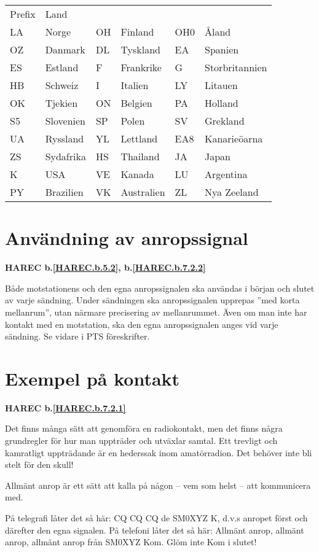 \begin{tabular}{llllll}
    Prefix & Land& & & &  \\
    LA & Norge & OH & Finland & OH0 & Åland\\
    OZ & Danmark & DL & Tyskland & EA & Spanien\\
    ES & Estland & F & Frankrike & G & Storbritannien\\
    HB & Schweiz & I & Italien & LY & Litauen\\
    OK & Tjekien & ON & Belgien & PA & Holland\\
    S5 & Slovenien & SP & Polen & SV & Grekland\\
    UA & Ryssland & YL & Lettland & EA8 & Kanarieöarna\\
    ZS & Sydafrika & HS & Thailand & JA & Japan\\
    K & USA & VE & Kanada & LU & Argentina\\
    PY & Brazilien & VK & Australien & ZL & Nya Zeeland\\
\end{tabular}


\section{Användning av anropssignal}
\textbf{HAREC
  b.\ref{HAREC.b.5.2}\label{myHAREC.b.5.2},
  b.\ref{HAREC.b.7.2.2}\label{myHAREC.b.7.2.2}
}

Både motstationens och den egna anropssignalen ska användas i början
och slutet av varje sändning.
Under sändningen ska anropssignalen upprepas ''med korta mellanrum'', utan
närmare precisering av mellanrummet.
Även om man inte har kontakt med en motstation, ska den egna anropssignalen
anges vid varje sändning.
Se vidare i PTS föreskrifter.

\section{Exempel på kontakt}
\textbf{HAREC
  b.\ref{HAREC.b.7.2.1}\label{myHAREC.b.7.2.1}
}

Det finns många sätt att genomföra en radiokontakt, men det finns
några grundregler för hur man uppträder och utväxlar samtal.
Ett trevligt och kamratligt uppträdande är en hederssak inom amatörradion.
Det behöver inte bli stelt för den skull!

Allmänt anrop är ett sätt att kalla på någon
-- vem som helst -- att kommunicera med.

På telegrafi låter det så här: CQ CQ CQ de SM0XYZ K, d.v.s anropet
först och därefter den egna signalen.
På telefoni låter det så här:
Allmänt anrop, allmänt anrop, allmänt anrop från SM0XYZ Kom.
Glöm inte Kom i slutet!


